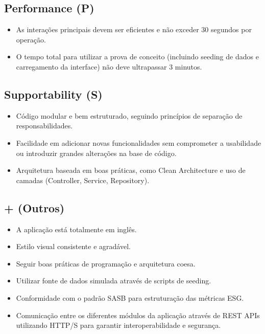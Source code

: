 \subsection{Performance (P)}
\begin{itemize}
    \item As interações principais devem ser eficientes e não exceder 30 segundos por operação.
    \item O tempo total para utilizar a prova de conceito (incluindo seeding de dados e carregamento da interface) não deve ultrapassar 3 minutos.
\end{itemize}

\subsection{Supportability (S)}
\begin{itemize}
    \item Código modular e bem estruturado, seguindo princípios de separação de responsabilidades.
    \item Facilidade em adicionar novas funcionalidades sem comprometer a usabilidade ou introduzir grandes alterações na base de código.
    \item Arquitetura baseada em boas práticas, como Clean Architecture e uso de camadas (Controller, Service, Repository).
\end{itemize}

\subsection{+ (Outros)}
\begin{itemize}
    \item A aplicação está totalmente em inglês.
    \item Estilo visual consistente e agradável.
    \item Seguir boas práticas de programação e arquitetura coesa.
    \item Utilizar fonte de dados simulada através de scripts de seeding.
    \item Conformidade com o padrão SASB para estruturação das métricas ESG.
    \item Comunicação entre os diferentes módulos da aplicação através de REST APIs utilizando HTTP/S para garantir interoperabilidade e segurança.
\end{itemize}


